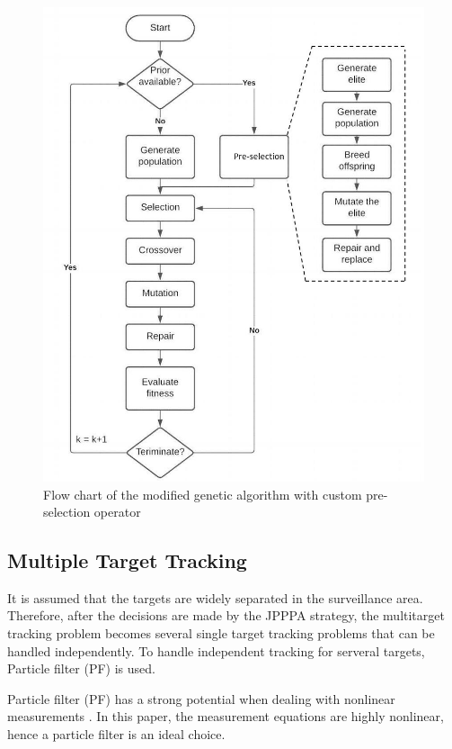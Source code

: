 \documentclass[12pt,journal,draftclsnofoot,onecolumn]{IEEEtran}
\begin{document}
\begin{figure}
	\centering
	\includegraphics[scale=0.36]{GA.jpg}
	\caption{Flow chart of the modified genetic algorithm with custom pre-selection operator}
	\label{fig:GA}
\end{figure}
\subsection{Multiple Target Tracking}

 It is assumed that the targets are widely separated in the surveillance area. Therefore, after the decisions are made by the JPPPA strategy, the multitarget tracking problem becomes several single target tracking problems that can be handled independently.
To handle independent tracking for serveral targets, Particle filter (PF) is used. 

Particle filter (PF) has a strong potential when dealing with nonlinear measurements \cite{arulampalam2002tutorial}. In this paper, the measurement equations are highly nonlinear, hence a particle filter is an ideal choice.
\end{document}
